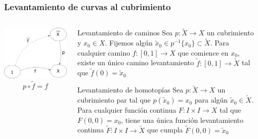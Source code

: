 \documentclass[xetex,mathserif,serif]{beamer}
\begin{document}
  \begin{frame}
    \frametitle{Levantamiento de curvas al cubrimiento}
    \begin{columns}
      \begin{column}{.4\textwidth}
        \centering
        \includegraphics[scale=0.3]{../tesis/imagenes/lifting-path.png}
        \[ p \circ \tilde f = f \]
      \end{column}
    \begin{column}{.6\textwidth}

      \begin{block}{Levantamiento de caminos}
        Sea \(p : \tilde X \to X\) un cubrimiento y \(x_0 \in X\).
        Fijemos algún \(\tilde x _0 \in p^{-1} \{x_0\} \subset \tilde
        X\). Para cualquier camino \(f : [0,1] \to X\) que comience en \(x_0\),
        existe un único camino levantamiento \(\tilde f : [0,1] \to \tilde X\)
        tal que \(\tilde f (0) = \tilde x _0\)
      \end{block}

      \begin{block}{Levantamiento de homotopías}
        Sea \(p : \tilde X \to X\) un cubrimiento par tal que \(p(\tilde
        x _0) = x_0 \) para algún \(\tilde x _0 \in \tilde X\). Para cualquier
        función continua \(F : I \times I \to X\) tal que \(F(0,0) = x_0\),
        tiene una única función levantamiento continua \(\tilde F : I \times I
        \to \tilde X\) que cumpla \(\tilde F (0,0) = \tilde x_0\)
      \end{block}
    \end{column}
    \end{columns}
  \end{frame}
\end{document}
